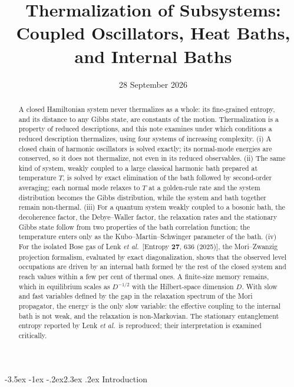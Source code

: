 \documentclass[10pt,a4paper]{article}
\title{Thermalization of Subsystems:\\
Coupled Oscillators, Heat Baths, and Internal Baths}
\author{}
\date{28 September 2026}
\makeatletter
\renewcommand{\section}{\@startsection{section}{1}{\z@}%
  {-3.5ex \@plus -1ex \@minus -.2ex}{2.3ex \@plus .2ex}%
  {\normalfont\fontsize{18pt}{22pt}\selectfont\bfseries}}
\makeatother
\begin{document}
\maketitle

\begin{abstract}
\noindent
A closed Hamiltonian system never thermalizes as a whole: its fine-grained entropy, and its distance to any Gibbs state, are constants of the motion.
Thermalization is a property of reduced descriptions, and this note examines under which conditions a reduced description thermalizes, using four systems of increasing complexity.
(i) A closed chain of harmonic oscillators is solved exactly; its normal-mode energies are conserved, so it does not thermalize, not even in its reduced observables.
(ii) The same kind of system, weakly coupled to a large classical harmonic bath prepared at temperature $ T $, is solved by exact elimination of the bath followed by second-order averaging; each normal mode relaxes to $ T $ at a golden-rule rate and the system distribution becomes the Gibbs distribution, while the system and bath together remain non-thermal.
(iii) For a quantum system weakly coupled to a bosonic bath, the decoherence factor, the Debye--Waller factor, the relaxation rates and the stationary Gibbs state follow from two properties of the bath correlation function; the temperature enters only as the Kubo--Martin--Schwinger parameter of the bath.
(iv) For the isolated Bose gas of Lenk \textit{et al.}\ [Entropy \textbf{27}, 636 (2025)], the Mori--Zwanzig projection formalism, evaluated by exact diagonalization, shows that the observed level occupations are driven by an internal bath formed by the rest of the closed system and reach values within a few per cent of thermal ones. A finite-size memory remains, which in equilibrium scales as $ D^{-1/2} $ with the Hilbert-space dimension $ D $. With slow and fast variables defined by the gap in the relaxation spectrum of the Mori propagator, the energy is the only slow variable: the effective coupling to the internal bath is not weak, and the relaxation is non-Markovian. The stationary entanglement entropy reported by Lenk \textit{et al.}\ is reproduced; their interpretation is examined critically.
\end{abstract}

\tableofcontents

\section{Introduction}
\label{sec:intro}
\end{document}
